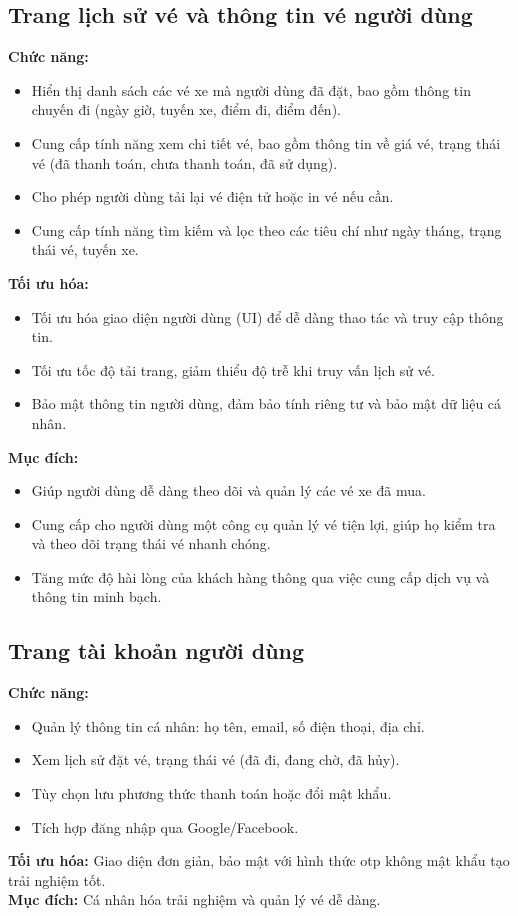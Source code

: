 \subsection*{Trang lịch sử vé và thông tin vé người dùng}
\textbf{Chức năng:}
\begin{itemize}
    \item Hiển thị danh sách các vé xe mà người dùng đã đặt, bao gồm thông tin chuyến đi (ngày giờ, tuyến xe, điểm đi, điểm đến).
    \item Cung cấp tính năng xem chi tiết vé, bao gồm thông tin về giá vé, trạng thái vé (đã thanh toán, chưa thanh toán, đã sử dụng).
    \item Cho phép người dùng tải lại vé điện tử hoặc in vé nếu cần.
    \item Cung cấp tính năng tìm kiếm và lọc theo các tiêu chí như ngày tháng, trạng thái vé, tuyến xe.
\end{itemize}
\textbf{Tối ưu hóa:} 
\begin{itemize}
    \item Tối ưu hóa giao diện người dùng (UI) để dễ dàng thao tác và truy cập thông tin.
    \item Tối ưu tốc độ tải trang, giảm thiểu độ trễ khi truy vấn lịch sử vé.
    \item Bảo mật thông tin người dùng, đảm bảo tính riêng tư và bảo mật dữ liệu cá nhân.
\end{itemize}
\textbf{Mục đích:} 
\begin{itemize}
    \item Giúp người dùng dễ dàng theo dõi và quản lý các vé xe đã mua.
    \item Cung cấp cho người dùng một công cụ quản lý vé tiện lợi, giúp họ kiểm tra và theo dõi trạng thái vé nhanh chóng.
    \item Tăng mức độ hài lòng của khách hàng thông qua việc cung cấp dịch vụ và thông tin minh bạch.
\end{itemize}


\subsection*{Trang tài khoản người dùng}
\textbf{Chức năng:}
\begin{itemize}
    \item Quản lý thông tin cá nhân: họ tên, email, số điện thoại, địa chỉ.
    \item Xem lịch sử đặt vé, trạng thái vé (đã đi, đang chờ, đã hủy).
    \item Tùy chọn lưu phương thức thanh toán hoặc đổi mật khẩu.
    \item Tích hợp đăng nhập qua Google/Facebook.
\end{itemize}
\textbf{Tối ưu hóa:} Giao diện đơn giản, bảo mật với hình thức otp không mật khẩu tạo trải nghiệm tốt.\\
\textbf{Mục đích:} Cá nhân hóa trải nghiệm và quản lý vé dễ dàng.

